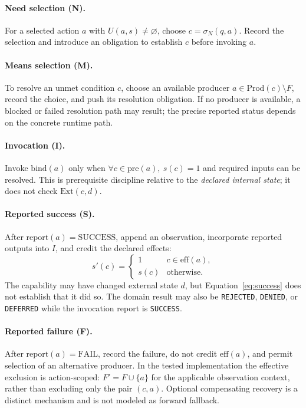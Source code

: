 \documentclass[11pt]{article}
\begin{document}
\paragraph{Need selection (N).} For a selected action $a$ with $U(a,s)\ne\varnothing$, choose $c=\sigma_N(q,a)$. Record the selection and introduce an obligation to establish $c$ before invoking $a$.

\paragraph{Means selection (M).} To resolve an unmet condition $c$, choose an available producer $a\in\mathrm{Prod}(c)\setminus F$, record the choice, and push its resolution obligation. If no producer is available, a blocked or failed resolution path may result; the precise reported status depends on the concrete runtime path.

\paragraph{Invocation (I).} Invoke $\mathrm{bind}(a)$ only when $\forall c\in\mathrm{pre}(a),\ s(c)=1$ and required inputs can be resolved. This is prerequisite discipline relative to the \emph{declared internal state}; it does not check $\mathrm{Ext}(c,d)$.

\paragraph{Reported success (S).} After $\mathrm{report}(a)=\mathrm{SUCCESS}$, append an observation, incorporate reported outputs into $I$, and credit the declared effects:
\begin{equation}
s'(c)=\begin{cases}1&c\in\mathrm{eff}(a),\\s(c)&\text{otherwise.}\end{cases}
\label{eq:success}
\end{equation}
The capability may have changed external state $d$, but Equation~\ref{eq:success} does not establish that it did so. The domain result may also be \texttt{REJECTED}, \texttt{DENIED}, or \texttt{DEFERRED} while the invocation report is \texttt{SUCCESS}.

\paragraph{Reported failure (F).} After $\mathrm{report}(a)=\mathrm{FAIL}$, record the failure, do not credit $\mathrm{eff}(a)$, and permit selection of an alternative producer. In the tested implementation the effective exclusion is action-scoped: $F'=F\cup\{a\}$ for the applicable observation context, rather than excluding only the pair $(c,a)$. Optional compensating recovery is a distinct mechanism and is not modeled as forward fallback.
\end{document}
